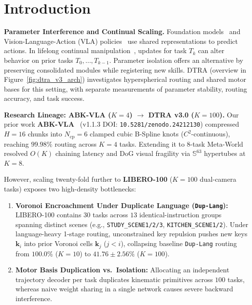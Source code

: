 \documentclass[10pt]{article}
\begin{document}
\section{Introduction}
\label{sec:intro}

\textbf{Parameter Interference and Continual Scaling.}
Foundation models~\cite{bommasani2021foundation} and Vision-Language-Action (VLA) policies~\cite{vaswani2017attention,brohan2023rt1,brohan2023rt2,octo2024,kim2024openvla,black2024pi0} use shared representations to predict actions. In lifelong continual manipulation~\cite{yu2020metaworld,wolczyk2021continual,liu2023libero}, updates for task $T_k$ can alter behavior on prior tasks $T_0, \dots, T_{k-1}$. Parameter isolation offers an alternative by preserving consolidated modules while registering new skills. DTRA (overview in Figure~\ref{fig:dtra_v3_arch}) investigates hyperspherical routing and shared motor bases for this setting, with separate measurements of parameter stability, routing accuracy, and task success.

\textbf{Research Lineage: ABK-VLA ($K=4$) $\to$ DTRA v3.0 ($K=100$).}
Our prior work \textbf{ABK-VLA}~\cite{son2026abkvla} (v1.1.3 DOI: \texttt{10.5281/zenodo.24212130}) compressed $H=16$ chunks into $N_{\text{cp}}=6$ clamped cubic B-Spline knots ($C^2$-continuous), reaching $99.98\%$ routing across $K=4$ tasks. Extending it to 8-task Meta-World~\cite{yu2020metaworld} resolved $O(K)$ chaining latency and DoG visual fragility via $\mathbb{S}^{63}$ hypertubes at $K=8$.

However, scaling twenty-fold further to \textbf{LIBERO-100} ($K=100$ dual-camera tasks) exposes two high-density bottlenecks:
\begin{enumerate}[leftmargin=*,itemsep=1.5pt,topsep=2pt]
  \item \textbf{Voronoi Encroachment Under Duplicate Language (\texttt{Dup-Lang}):} LIBERO-100 contains $30$ tasks across $13$ identical-instruction groups spanning distinct scenes (e.g., \texttt{STUDY\_SCENE1/2/3}, \texttt{KITCHEN\_SCENE1/2}). Under language-heavy 1-stage routing, unconstrained key repulsion pushes new keys $\mathbf{k}_i$ into prior Voronoi cells $\mathbf{k}_j$ ($j < i$), collapsing baseline \texttt{Dup-Lang} routing from $100.0\%$ ($K=10$) to $41.76 \pm 2.56$\% ($K=100$).
  \item \textbf{Motor Basis Duplication vs.\ Isolation:} Allocating an independent trajectory decoder per task duplicates kinematic primitives across $100$ tasks, whereas naive weight sharing in a single network causes severe backward interference.
\end{enumerate}
\end{document}
